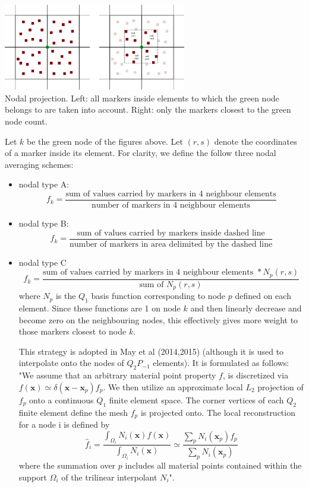 \begin{center}
\includegraphics[width=8cm]{python_codes/fieldstone_13/markers2}\\
{\small Nodal projection. Left: all markers inside elements to which the green node belongs to are taken into account. Right: only the markers closest to the green node count. }
\end{center}

Let $k$ be the green node of the figures above. Let $(r,s)$ denote the coordinates of a marker inside its element.
For clarity, we define the follow three nodal averaging schemes:
\begin{itemize}
\item nodal type A: 
\[
f_k = \frac{\text{sum of values carried by markers in 4 neighbour elements}}
{\text{number of markers in 4 neighbour elements}}
\]
\item nodal type B: 
\[
f_k = \frac{\text{sum of values carried by markers inside dashed line}}
{\text{number of markers in area delimited by the dashed line}}
\]
\item nodal type C 
\[
f_k = \frac{\text{sum of values carried by markers in 4 neighbour elements } * N_p(r,s)}
{\text{sum of }N_p(r,s)} 
\]
where $N_p$ is the $Q_1$ basis function corresponding to node $p$ defined on each element. Since these 
functions are 1 on node $k$ and then linearly decrease and become zero on the neighbouring nodes, this
effectively gives more weight to those markers closest to node $k$.

This strategy is adopted in May et al (2014,2015) \cite{mabl14,mabl15} 
(although it is used to interpolate onto the nodes of $Q_2P_{-1}$ elements). 
It is formulated as follows:\\
"We assume that an arbitrary material point property $f$, is discretized via 
$f(\bm x)\simeq \delta(\bm x - \bm x_p) f_p$. We then utilize an approximate local $L_2$ projection
of $f_p$ onto a continuous $Q_1$ finite element space. The corner vertices of
each $Q_2$ finite element define the mesh $f_p$ is projected onto.
The local reconstruction for a node i is defined by
\[
\hat{f}_i = \frac{\int_{\Omega_i}N_i(\bm x) f(\bm x)}{\int_{\Omega_i} N_i(\bm x)} \simeq
\frac{\sum_p N_i(\bm x_p) f_p }{\sum_p N_i(\bm x_p)}
\]
where the summation over $p$ includes all material points 
contained within the support $\Omega_i$ of the trilinear interpolant $N_i$".
\end{itemize}


